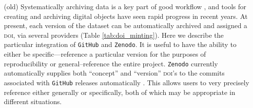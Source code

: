 \documentclass[a4paper,11pt]{article}
\begin{document}
(old) Systematically archiving data is a key part of good workflow \citep{Wilkinson-2016, Piwowar-2011, Whitlock-2011}, and tools for creating and archiving digital objects have seen rapid progress in recent years. At present, each version of the dataset can be automatically archived and assigned a \textsc{doi}, via several providers (Table \ref{tab:doi_minting}). Here we describe the particular integration of \texttt{GitHub} and \texttt{Zenodo}. It is useful to have the ability to either be specific---reference a particular version for the purposes of reproducibility or general--reference the entire project. \texttt{Zenodo} currently automatically supplies both ``concept'' and ``version'' \textsc{doi}'s to the commits associated with \texttt{GitHub} releases automatically \citep[Fig. \ref{fig:semantic} and ][]{Nielsen-2017}. This allows users to very precisely reference either generally or specifically, both of which may be appropriate in different situations.





\end{document}
